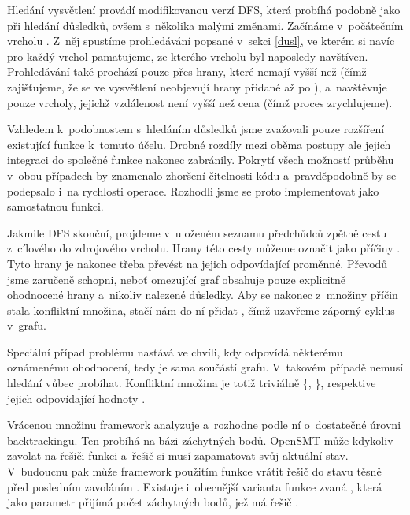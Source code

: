 Hledání vysvětlení provádí  modifikovanou verzí DFS, která probíhá podobně jako při hledání důsledků, ovšem s~několika malými změnami. Začínáme v~počátečním vrcholu . Z~něj spustíme prohledávání popsané v~sekci \ref{dusl}, ve kterém si navíc pro každý vrchol pamatujeme, ze kterého vrcholu byl naposledy navštíven. Prohledávání také prochází pouze přes hrany, které nemají  vyšší než  (čímž zajišťujeme, že se ve vysvětlení neobjevují hrany přidané až po ), a~navštěvuje pouze vrcholy, jejichž vzdálenost není vyšší než cena  (čímž proces zrychlujeme).

Vzhledem k~podobnostem s~hledáním důsledků jsme zvažovali pouze rozšíření existující funkce  k~tomuto účelu. Drobné rozdíly mezi oběma postupy ale jejich integraci do společné funkce nakonec zabránily. Pokrytí všech možností průběhu v~obou případech by znamenalo zhoršení čitelnosti kódu a~pravděpodobně by se podepsalo i~na rychlosti operace. Rozhodli jsme se proto implementovat  jako samostatnou funkci.

Jakmile DFS skonční, projdeme v~uloženém seznamu předchůdců zpětně cestu z~cílového do zdrojového vrcholu. Hrany této cesty můžeme označit jako příčiny . Tyto hrany je nakonec třeba převést na jejich odpovídající  proměnné. Převodů jsme zaručeně schopni, neboť omezující graf obsahuje pouze explicitně ohodnocené hrany a~nikoliv nalezené důsledky. Aby se nakonec z~množiny příčin stala konfliktní množina, stačí nám do ní přidat , čímž uzavřeme záporný cyklus v~grafu. 

Speciální případ problému nastává ve chvíli, kdy  odpovídá některému oznámenému ohodnocení, tedy je sama součástí grafu. V~takovém případě nemusí hledání vůbec probíhat. Konfliktní množina je totiž triviálně \{, \}, respektive jejich odpovídající hodnoty .

Vrácenou množinu framework analyzuje a~rozhodne podle ní o~dostatečné úrovni backtrackingu. Ten probíhá na bázi záchytných bodů. OpenSMT může kdykoliv zavolat na řešiči funkci  a~řešič si musí zapamatovat svůj aktuální stav. V~budoucnu pak může framework použitím funkce  vrátit řešič do stavu těsně před posledním zavoláním . Existuje i~obecnější varianta funkce zvaná , která jako parametr přijímá počet záchytných bodů, jež má řešič .

